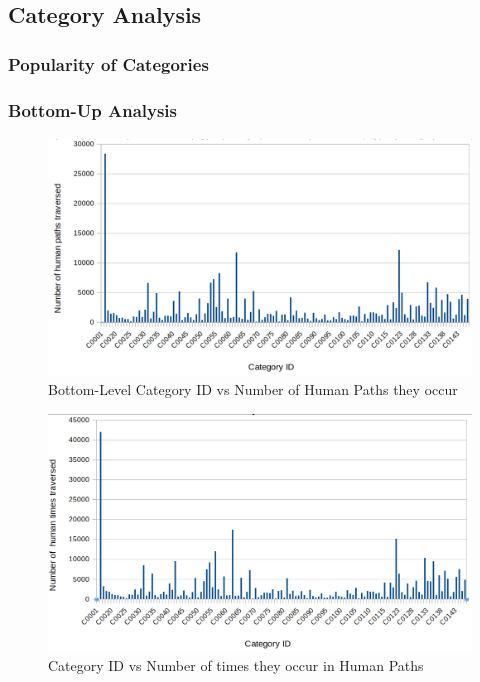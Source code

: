 \documentclass[12pt]{article}
\begin{document}
\subsection{Category Analysis}	

\subsubsection{Popularity of Categories}
\subsubsection{Bottom-Up Analysis}
\begin{figure}[h]
    \centering
    \includegraphics[scale = 0.4]{images/q8_number_of_paths.png}
    \caption{Bottom-Level Category ID vs Number of Human Paths they occur}
\end{figure}
\pagebreak

\begin{figure}[h]
    \centering
    \hspace{-60pt}
    \includegraphics[scale = 0.47]{images/q8_number_of_times.png}
    \caption{Category ID vs Number of times they occur in Human Paths}
\end{figure}
\end{document}
